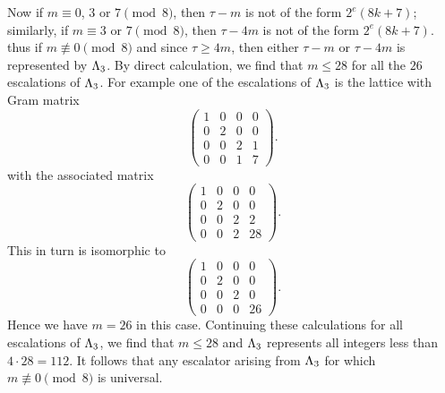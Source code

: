 Now if \(m \equiv 0\), \(3\) or \(7 \pmod{8}\), then \(\tau - m\) is not of the
form \(2^e(8k+7)\); similarly, if \(m \equiv 3\) or \(7 \pmod{8}\), then \(\tau
- 4m\) is not of the form \(2^e(8k+7)\). thus if \(m \not\equiv 0 \pmod{8}\) and
since \(\tau \geq 4m\), then either \(\tau - m\) or \(\tau - 4m\) is represented
by \(\Lambda_3\). By direct calculation, we find that \(m \leq 28\) for all the
\(26\) escalations of \(\Lambda_3\). For example one of the escalations of
\(\Lambda_3\) is the lattice with Gram matrix
\[
    \begin{pmatrix}
        1 & 0 & 0 & 0 \\
        0 & 2 & 0 & 0 \\
        0 & 0 & 2 & 1 \\
        0 & 0 & 1 & 7
    \end{pmatrix}.
\]
with the associated matrix
\[
    \begin{pmatrix}
        1 & 0 & 0 & 0 \\
        0 & 2 & 0 & 0 \\
        0 & 0 & 2 & 2 \\
        0 & 0 & 2 & 28
    \end{pmatrix}.
\]
This in turn is isomorphic to
\[
    \begin{pmatrix}
        1 & 0 & 0 & 0 \\
        0 & 2 & 0 & 0 \\
        0 & 0 & 2 & 0 \\
        0 & 0 & 0 & 26
    \end{pmatrix}.
\]
Hence we have \(m = 26\) in this case. Continuing these calculations for all
escalations of \(\Lambda_3\), we find that \(m \leq 28\) and \(\Lambda_3\)
represents all integers less than \(4 \cdot 28 = 112\). It follows that any
escalator arising from \(\Lambda_3\) for which \(m \not\equiv 0 \pmod{8}\) is
universal.

